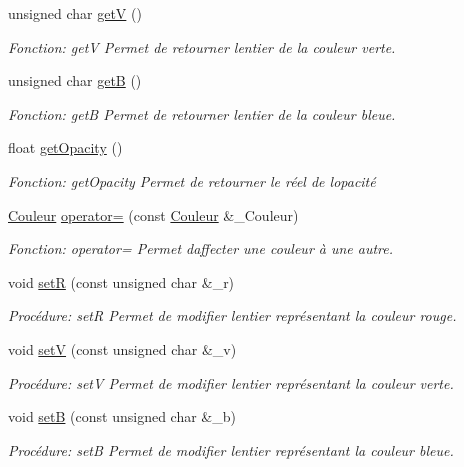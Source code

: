 \begin{DoxyCompactItemize}
unsigned char \hyperlink{classCouleur_a15c9bd61ea816ad1fb9a7e13806142c7}{getV} ()
\begin{DoxyCompactList}\small\item\em Fonction\+: getV Permet de retourner l\textquotesingle{}entier de la couleur verte. \end{DoxyCompactList}\item 
unsigned char \hyperlink{classCouleur_aab24066e81089a96d15bcb04aa2c77df}{getB} ()
\begin{DoxyCompactList}\small\item\em Fonction\+: getB Permet de retourner l\textquotesingle{}entier de la couleur bleue. \end{DoxyCompactList}\item 
float \hyperlink{classCouleur_afb394e815103a2245bc5c3b5b513f05b}{get\+Opacity} ()
\begin{DoxyCompactList}\small\item\em Fonction\+: get\+Opacity Permet de retourner le réel de l\textquotesingle{}opacité \end{DoxyCompactList}\item 
\hyperlink{classCouleur}{Couleur} \hyperlink{classCouleur_a939297e6a11ff80510d6acf02bfa3ac0}{operator=} (const \hyperlink{classCouleur}{Couleur} \&\+\_\+\+Couleur)
\begin{DoxyCompactList}\small\item\em Fonction\+: operator= Permet d\textquotesingle{}affecter une couleur à une autre. \end{DoxyCompactList}\item 
void \hyperlink{classCouleur_aeb7507061466c7c1e18d3b870f876ac0}{setR} (const unsigned char \&\+\_\+r)
\begin{DoxyCompactList}\small\item\em Procédure\+: setR Permet de modifier l\textquotesingle{}entier représentant la couleur rouge. \end{DoxyCompactList}\item 
void \hyperlink{classCouleur_a7aa9a8ce100008ef3551064b1c7bfe47}{setV} (const unsigned char \&\+\_\+v)
\begin{DoxyCompactList}\small\item\em Procédure\+: setV Permet de modifier l\textquotesingle{}entier représentant la couleur verte. \end{DoxyCompactList}\item 
void \hyperlink{classCouleur_ac598f1ad284ae2b59c5d781306ae9b0f}{setB} (const unsigned char \&\+\_\+b)
\begin{DoxyCompactList}\small\item\em Procédure\+: setB Permet de modifier l\textquotesingle{}entier représentant la couleur bleue. \end{DoxyCompactList}\item 

\end{DoxyCompactItemize}
